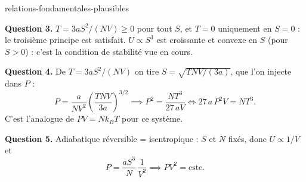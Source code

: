 \begin{exo}{relations-fondamentales-plausibles}
\begin{solution}
\textbf{Question 3.} $T = 3aS^2/(NV) \geq 0$ pour tout $S$, et $T = 0$ uniquement en $S = 0$ : le troisième principe est satisfait. $U \propto S^3$ est croissante et convexe en $S$ (pour $S>0$) : c'est la condition de stabilité vue en cours.

\textbf{Question 4.} De $T = 3aS^2/(NV)$ on tire $S = \sqrt{TNV/(3a)}$, que l'on injecte dans $P$ :
\[
P = \frac{a}{NV^2}\left(\frac{TNV}{3a}\right)^{3/2} \implies P^2 = \frac{NT^3}{27\,aV} \iff 27\,a\,P^2V = NT^3.
\]
C'est l'analogue de $PV = Nk_BT$ pour ce système.

\textbf{Question 5.} Adiabatique réversible = isentropique : $S$ et $N$ fixés, donc $U \propto 1/V$ et
\[
P = \frac{aS^3}{N}\,\frac{1}{V^2} \implies PV^2 = \text{cste}.
\]
\end{solution}
\end{exo}

